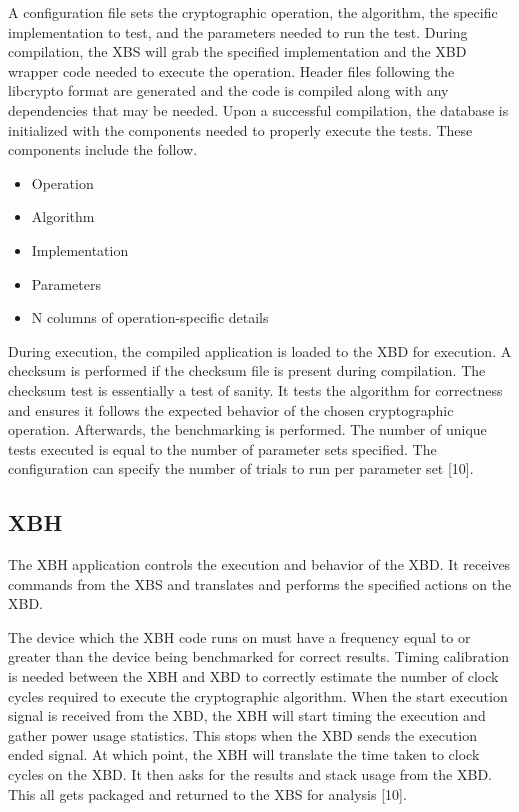 \documentclass[10pt]{article}
\begin{document}
A configuration file sets the cryptographic operation, the algorithm, the specific 
implementation to test, and the parameters needed to run the test. During compilation, 
the XBS will grab the specified implementation and the XBD wrapper code needed to execute 
the operation. Header files following the libcrypto format are generated and the code 
is compiled along with any dependencies that may be needed.
Upon a successful compilation, the database is initialized with the components needed 
to properly execute the tests. These components include the follow.

\begin{itemize}
  \item Operation
  \item Algorithm
  \item Implementation
  \item Parameters
  \item N columns of operation-specific details
\end{itemize}

During execution, the compiled application is loaded to the XBD for execution. 
A checksum is performed if the checksum file is present during compilation. The checksum 
test is essentially a test of sanity. It tests the algorithm for correctness and ensures 
it follows the expected behavior of the chosen cryptographic operation. Afterwards, the 
benchmarking is performed. The number of unique tests executed is equal to the number of 
parameter sets specified. The configuration can specify the number of trials to run per 
parameter set [10].

\subsection{XBH}
The XBH application controls the execution and behavior of the XBD. It receives commands 
from the XBS and translates and performs the specified actions on the XBD.

The device which the XBH code runs on must have a frequency equal to or greater than the 
device being benchmarked for correct results. Timing calibration is needed between the XBH 
and XBD to correctly estimate the number of clock cycles required to execute the cryptographic 
algorithm. When the start execution signal is received from the XBD, the XBH will start timing 
the execution and gather power usage statistics. This stops when the XBD sends the 
execution ended signal. At which point, the XBH will translate the time taken to clock cycles 
on the XBD. It then asks for the results and stack usage from the XBD.
This all gets packaged and returned to the XBS for analysis [10].
\end{document}

